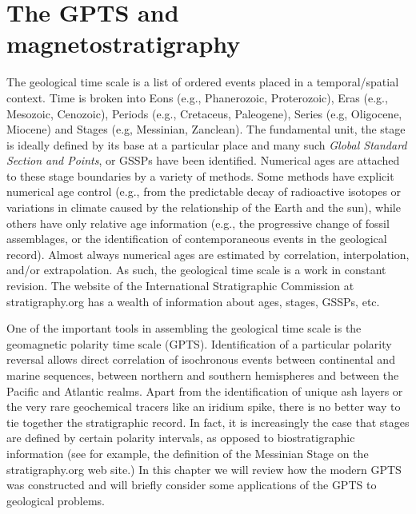 


\chapter{The GPTS and magnetostratigraphy}


The geological time scale is a list of ordered events placed in a temporal/spatial context.  Time  is broken into Eons (e.g., Phanerozoic, Proterozoic), Eras (e.g., Mesozoic, Cenozoic),  Periods (e.g., Cretaceus, Paleogene), Series (e.g, Oligocene, Miocene) and Stages (e.g, Messinian, Zanclean).   The fundamental unit, the stage is ideally defined by its base at a particular place and many such  
{\it Global Standard Section and Points}, or GSSPs have been identified.  Numerical ages are attached to these stage boundaries by a variety of methods.    Some methods have explicit numerical age control (e.g., from the predictable decay of radioactive isotopes or  variations in climate caused by the relationship of the Earth and the sun), while others have only relative age  information (e.g., the progressive change  of fossil assemblages, or the identification of contemporaneous events in the geological record).   Almost always numerical ages are estimated by correlation, interpolation,  and/or extrapolation.  As such, the geological time scale is a work in constant revision.  The website of the International Stratigraphic Commission at stratigraphy.org has a wealth of information about ages, stages, GSSPs, etc.

One of the important tools in assembling the geological time scale is the  
geomagnetic polarity time scale (GPTS).  
Identification of a particular polarity reversal allows direct correlation of isochronous events between continental and marine sequences, between northern and southern hemispheres and between the Pacific and Atlantic realms.  Apart from the identification of unique ash layers or the very rare geochemical tracers like an iridium spike, there is no better way to tie together the stratigraphic record.  In fact, it is increasingly the case that stages are defined by certain polarity intervals, as opposed to biostratigraphic information (see for example, the definition of the Messinian Stage on the stratigraphy.org web site.)   In this chapter we will review how the modern GPTS was constructed and will briefly consider some applications of the GPTS to geological problems.  



